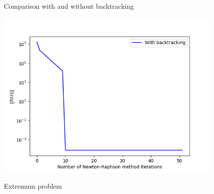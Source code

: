 \documentclass{article}
\begin{document}
\begin{figure}[h]
\begin{minipage}[c]{.3\linewidth}
    \caption{Comparison with and without backtracking}
    \label{fig:Comp_back} 
\end{minipage}
\hfill%
\begin{minipage}[c]{.30\linewidth}
    \centering
    \includegraphics[scale=0.37]{Pictures/Newton_Raphson_pictures/extremum.png}
    \label{fig:extremum} 
    \caption{Extremum problem}
\end{minipage}
\end{figure}
\end{document}
